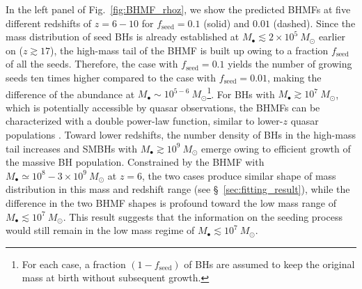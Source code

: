 \documentclass[twocolumn, twocolappendix]{aastex63}
\newcommand{\Msun}{M_\odot}
\newcommand{\fseed}{f_\mathrm{seed}}
\begin{document}
\begin{CJK*}{UTF8}{gbsn}
In the left panel of Fig.~\ref{fig:BHMF_rhoz}, we show the predicted BHMFs at five different redshifts of $z=6-10$
for $\fseed=0.1$ (solid) and $0.01$ (dashed).
Since the mass distribution of seed BHs is already established at $M_\bullet \lesssim 2\times10^5~\Msun$ earlier on ($z\gtrsim 17$),
the high-mass tail of the BHMF is built up owing to a fraction $\fseed$ of all the seeds.
Therefore, the case with $\fseed=0.1$ yields the number of growing seeds ten times higher compared to the case with $\fseed =0.01$,
making the difference of the abundance at $M_\bullet \sim 10^{5-6}~\Msun$\footnote{
For each case, a fraction $(1-\fseed)$ of BHs are assumed to keep the original mass at birth without subsequent growth.}.
For BHs with $M_\bullet \gtrsim 10^7~\Msun$, which is potentially accessible by quasar observations,
the BHMFs can be characterized with a double power-law function,
similar to lower-$z$ quasar populations \citep[e.g.,][]{2013ApJ...764...45K,2015MNRAS.447.2085S}.
Toward lower redshifts, the number density of BHs in the high-mass tail increases
and SMBHs with $M_\bullet \gtrsim 10^9~\Msun$ emerge owing to efficient growth of the massive BH population.
Constrained by the  BHMF with $M_\bullet \simeq 10^8-3\times 10^9~\Msun$ at $z=6$,
the two cases produce similar shape of mass distribution in this mass and redshift range (see \S~\ref{sec:fitting_result}),
while the difference in the two BHMF shapes is profound toward the low mass range of $M_\bullet \lesssim 10^7~\Msun$.
This result suggests that the information on the seeding process would still remain in the low mass regime of $M_\bullet \lesssim 10^7~\Msun$.
%





\end{CJK*}
\end{document}
